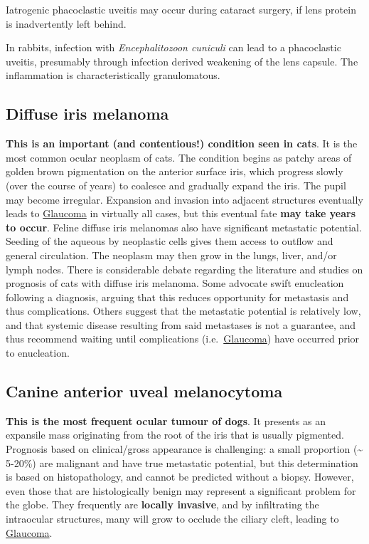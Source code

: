 \documentclass[
  openany]{article}
\begin{document}
Iatrogenic phacoclastic uveitis may occur during cataract surgery, if lens protein is inadvertently left behind.

In rabbits, infection with \emph{Encephalitozoon cuniculi} can lead to a phacoclastic uveitis, presumably through infection derived weakening of the lens capsule. The inflammation is characteristically granulomatous.

\hypertarget{diffuse-iris-melanoma}{%
\subsection{Diffuse iris melanoma}\label{diffuse-iris-melanoma}}

\textbf{This is an important (and contentious!) condition seen in cats}. It is the most common ocular neoplasm of cats. The condition begins as patchy areas of golden brown pigmentation on the anterior surface iris, which progress slowly (over the course of years) to coalesce and gradually expand the iris. The pupil may become irregular. Expansion and invasion into adjacent structures eventually leads to \protect\hyperlink{glaucoma}{Glaucoma} in virtually all cases, but this eventual fate \textbf{may take years to occur}. Feline diffuse iris melanomas also have significant metastatic potential. Seeding of the aqueous by neoplastic cells gives them access to outflow and general circulation. The neoplasm may then grow in the lungs, liver, and/or lymph nodes. There is considerable debate regarding the literature and studies on prognosis of cats with diffuse iris melanoma. Some advocate swift enucleation following a diagnosis, arguing that this reduces opportunity for metastasis and thus complications. Others suggest that the metastatic potential is relatively low, and that systemic disease resulting from said metastases is not a guarantee, and thus recommend waiting until complications (i.e.~\protect\hyperlink{glaucoma}{Glaucoma}) have occurred prior to enucleation.

\hypertarget{canine-anterior-uveal-melanocytoma}{%
\subsection{Canine anterior uveal melanocytoma}\label{canine-anterior-uveal-melanocytoma}}

\textbf{This is the most frequent ocular tumour of dogs}. It presents as an expansile mass originating from the root of the iris that is usually pigmented. Prognosis based on clinical/gross appearance is challenging: a small proportion (\textasciitilde{} 5-20\%) are malignant and have true metastatic potential, but this determination is based on histopathology, and cannot be predicted without a biopsy. However, even those that are histologically benign may represent a significant problem for the globe. They frequently are \textbf{locally invasive}, and by infiltrating the intraocular structures, many will grow to occlude the ciliary cleft, leading to \protect\hyperlink{glaucoma}{Glaucoma}.
\end{document}
